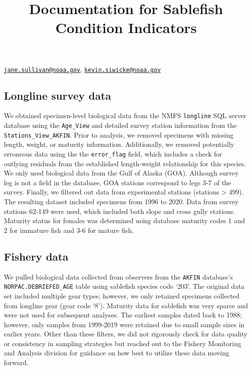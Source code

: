 \documentclass[
]{article}
\title{Documentation for Sablefish Condition Indicators}
\author{}
\date{\vspace{-2.5em}}
\begin{document}
\maketitle

\href{mailto:jane.sullivan@noaa.gov}{\nolinkurl{jane.sullivan@noaa.gov}},
\href{mailto:kevin.siwicke@noaa.gov}{\nolinkurl{kevin.siwicke@noaa.gov}}

\hypertarget{longline-survey-data}{%
\subsection{Longline survey data}\label{longline-survey-data}}

We obtained specimen-level biological data from the NMFS
\texttt{longline} SQL server database using the \texttt{Age\_View} and
detailed survey station information from the
\texttt{Stations\_View\_AKFIN}. Prior to analysis, we removed specimens
with missing length, weight, or maturity information. Additionally, we
removed potentially erroneous data using the the \texttt{error\_flag}
field, which includes a check for outlying residuals from the
established length-weight relationship for this species. We only used
biological data from the Gulf of Alaska (GOA). Although survey leg is
not a field in the database, GOA stations correspond to legs 3-7 of the
survey. Finally, we filtered out data from experimental stations
(stations \textgreater{} 499). The resulting dataset included specimens
from 1996 to 2020. Data from survey stations 62-149 were used, which
included both slope and cross gully stations. Maturity status for
females was determined using database maturity codes 1 and 2 for
immature fish and 3-6 for mature fish.

\hypertarget{fishery-data}{%
\subsection{Fishery data}\label{fishery-data}}

We pulled biological data collected from observers from the
\texttt{AKFIN} database's \texttt{NORPAC.DEBRIEFED\_AGE} table using
sablefish species code `203'. The original data set included multiple
gear types; however, we only retained specimens collected from longline
gear (gear code `8'). Maturity data for sablefish was very sparse and
were not used for subsequent analyses. The earliest samples dated back
to 1988; however, only samples from 1999-2019 were retained due to small
sample sizes in earlier years. Other than these filters, we did not
rigorously check for data quality or consistency in sampling strategies
but reached out to the Fishery Monitoring and Analysis division for
guidance on how best to utilize these data moving forward.
\end{document}

